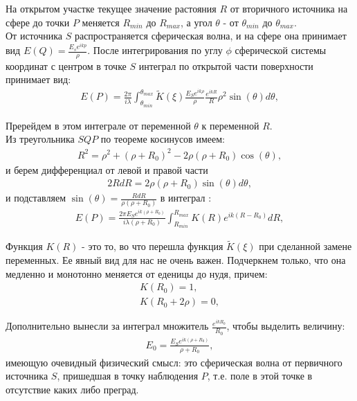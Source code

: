 На открытом участке текущее значение растояния $R$ от вторичного источника на сфере до точки $P$ меняется $R_{min}$ до $R_{max}$, а угол $\theta$ - от $\theta_{min}$ до $\theta_{max}$.\\

От источника $S$ распространяется сферическая волна, и на сфере она принимает вид $E(Q)=\frac{E_s e^{ikp}}{\rho}$. После интегрирования по углу $\phi$ сферической системы координат с центром в точке $S$ интеграл по открытой части поверхности принимает вид:\\
\begin{gather}
E(P)=\frac{2\pi}{i\lambda} \int_{\theta_{min}}^{\theta_{max}} \tilde{K} (\xi) \frac{E_S e^{ik\rho}}{\rho} \frac{e^{ikR}}{R} \rho^2 \sin(\theta) d\theta ,
\end{gather}

Пререйдем в этом интеграле от переменной $\theta$ к переменной $R$.\\
Из треугольника $SQP$ по теореме косинусов имеем:
\begin{gather}
R^2 = \rho^2 + (\rho + R_0)^2 - 2\rho(\rho + R_0)\cos(\theta) ,
\end{gather}
и берем дифференциал от левой и правой части
\begin{gather}
2RdR = 2\rho(\rho + R_0)\sin(\theta)d\theta ,
\end{gather}
и подставляем $\sin (\theta) = \frac{RdR}{\rho(\rho + R_0)}$ в интеграл :
\begin{gather}
E(P) = \frac{2\pi E_S e^{ik(\rho + R_0)}}{i\lambda(\rho + R_0)} \int_{R_{min}}^{R_{max}} K(R)e^{ik(R-R_0)}dR ,
\end{gather}

Функция $K(R)$ - это то, во что перешла функция $\tilde{K}(\xi)$ при сделанной замене переменных. Ее явный вид для нас не очень важен. Подчеркнем только, что она медленно и монотонно меняется от еденицы до нудя, причем:
\begin{gather}
K(R_0) = 1 , \\
K(R_0+2\rho) = 0 ,
\end{gather}

Дополнительно вынесли за интеграл множитель $\frac{e^{ikR_0}}{R_0}$, чтобы выделить величину:
\begin{gather}
E_0 = \frac{E_S e^{ik(\rho + R_0)}}{\rho + R_0} ,
\end{gather}
имеющую очевидный физический смысл: это сферическая волна от первичного источника $S$, пришедшая в точку наблюдения $P$, т.е. поле в этой точке в отсутствие каких либо преград.\\

